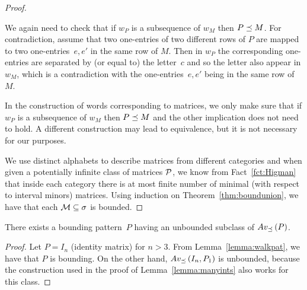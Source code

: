 \begin{proof}
\begin{itemize}
	We again need to check that if $w_P$ is a subsequence of $w_M$ then $P\preceq M$. For contradiction, assume that two one-entries of two different rows of $P$ are mapped to two one-entries~$e,e'$ in the same row of $M$. Then in $w_P$ the corresponding one-entries are separated by (or equal to) the letter~$c$ and so the letter also appear in $w_M$, which is a contradiction with the one-entries~$e,e'$ being in the same row of $M$.
\end{itemize}

In the construction of words corresponding to matrices, we only make sure that if $w_P$ is a subsequence of $w_M$ then $P\preceq M$ and the other implication does not need to hold. A different construction may lead to equivalence, but it is not necessary for our purposes.

We use distinct alphabets to describe matrices from different categories and when given a potentially infinite class of matrices $\mathcal{P}$, we know from Fact~\ref{fct:Higman} that inside each category there is at most finite number of minimal (with respect to interval minors) matrices. Using induction on Theorem~\ref{thm:boundunion}, we have that each $\mathcal{M}\subseteq\sigma$ is bounded.
\end{proof}

\begin{obs}
There exists a bounding pattern~$P$ having an unbounded subclass of $Av_{\preceq}\left(P\right)$.
\end{obs}
\begin{proof}
Let $P=I_n$ (identity matrix) for $n>3$. From Lemma~\ref{lemma:walkpat}, we have that $P$ is bounding. On the other hand, $Av_{\preceq}\left(I_n,P_1\right)$ is unbounded, because the construction used in the proof of Lemma~\ref{lemma:manyints} also works for this class.
\end{proof}

